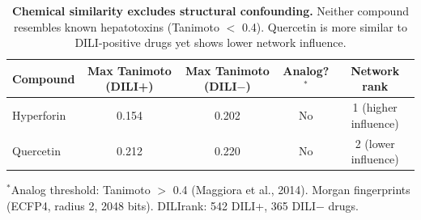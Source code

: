 \begin{table}[ht]
\centering
\caption{\textbf{Chemical similarity excludes structural confounding.}
Neither compound resembles known hepatotoxins (Tanimoto $<$ 0.4).
Quercetin is more similar to DILI-positive drugs yet shows lower network influence.}
\label{tab:chemsim}
\vspace{0.5em}
\begin{tabular}{@{}lcccc@{}}
\toprule
\textbf{Compound} & \textbf{Max Tanimoto (DILI+)} & \textbf{Max Tanimoto (DILI$-$)} & \textbf{Analog?}$^*$ & \textbf{Network rank} \\
\midrule
Hyperforin & 0.154 & 0.202 & No & 1 (higher influence) \\
Quercetin & 0.212 & 0.220 & No & 2 (lower influence) \\
\bottomrule
\end{tabular}

\vspace{0.3em}
\begin{minipage}{\linewidth}
\footnotesize
$^*$Analog threshold: Tanimoto $>$ 0.4 (Maggiora et al., 2014). Morgan fingerprints (ECFP4, radius 2, 2048 bits). DILIrank: 542 DILI+, 365 DILI$-$ drugs.
\end{minipage}
\end{table}

